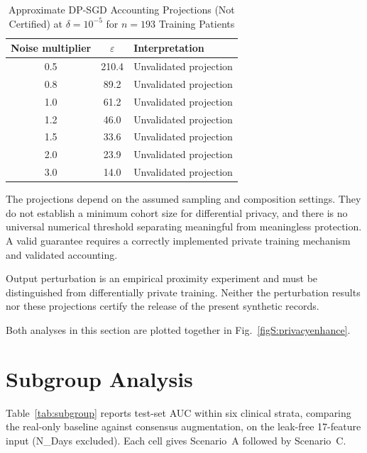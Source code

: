 \documentclass[manuscript,review,screen,nonacm]{acmart}
\newif\ifshowrevisions
\DeclareRobustCommand{\rev}[1]{\ifshowrevisions{\color{revisionblue}#1}\else#1\fi}
\newcommand{\revisioncolor}{\ifshowrevisions\color{revisionblue}\fi}
\begin{document}
\begin{table}[!t]
  \centering
  \caption{\revisioncolor Approximate DP-SGD Accounting Projections (Not Certified) at $\delta = 10^{-5}$ for $n = 193$ Training Patients}
  \label{tab:dpsgd}
  \begin{tabular}{ccl}
    \toprule
    Noise multiplier & $\varepsilon$ & Interpretation \\
    \midrule
    0.5 & 210.4 & Unvalidated projection \\
    0.8 & 89.2 & Unvalidated projection \\
    1.0 & 61.2 & Unvalidated projection \\
    1.2 & 46.0 & Unvalidated projection \\
    1.5 & 33.6 & Unvalidated projection \\
    2.0 & 23.9 & Unvalidated projection \\
    3.0 & 14.0 & Unvalidated projection \\
    \bottomrule
  \end{tabular}
\end{table}

\rev{The projections depend on the assumed sampling and composition settings. They do not establish a minimum cohort size for differential privacy, and there is no universal numerical threshold separating meaningful from meaningless protection. A valid guarantee requires a correctly implemented private training mechanism and validated accounting.}

\rev{Output perturbation is an empirical proximity experiment and must be distinguished from differentially private training. Neither the perturbation results nor these projections certify the release of the present synthetic records.}

Both analyses in this section are plotted together in Fig.~\ref{figS:privacyenhance}.

\section{Subgroup Analysis}

Table~\ref{tab:subgroup} reports test-set AUC within six clinical strata, comparing the real-only baseline against consensus augmentation, on the leak-free 17-feature input (N\_Days excluded). Each cell gives Scenario~A followed by Scenario~C.
\end{document}
